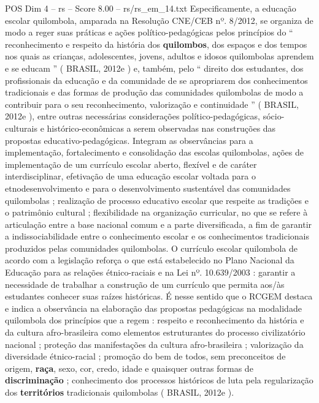 \begin{textsample}{POS Dim 4 – rs – Score 8.00 – rs/rs\_em\_14.txt}
Especificamente, a educação escolar quilombola, amparada na Resolução CNE/CEB nº. 8/2012, se organiza de modo a reger suas práticas e ações político-pedagógicas pelos princípios do “ reconhecimento e respeito da história dos \textbf{quilombos}, dos espaços e dos tempos nos quais as crianças, adolescentes, jovens, adultos e idosos quilombolas aprendem e se educam ” ( BRASIL, 2012e ) e, também, pelo “ direito dos estudantes, dos profissionais da educação e da comunidade de se apropriarem dos conhecimentos tradicionais e das formas de produção das comunidades quilombolas de modo a contribuir para o seu reconhecimento, valorização e continuidade ” ( BRASIL, 2012e ), entre outras necessárias considerações político-pedagógicas, sócio-culturais e histórico-econômicas a serem observadas nas construções das propostas educativo-pedagógicas.
Integram as observâncias para a implementação, fortalecimento e consolidação das escolas quilombolas, ações de implementação de um currículo escolar aberto, flexível e de caráter interdisciplinar, efetivação de uma educação escolar voltada para o etnodesenvolvimento e para o desenvolvimento sustentável das comunidades quilombolas ; realização de processo educativo escolar que respeite as tradições e o patrimônio cultural ; flexibilidade na organização curricular, no que se refere à articulação entre a base nacional comum e a parte diversificada, a fim de garantir a indissociabilidade entre o conhecimento escolar e os conhecimentos tradicionais produzidos pelas comunidades quilombolas.
O currículo escolar quilombola de acordo com a legislação reforça o que está estabelecido no Plano Nacional da Educação para as relações étnico-raciais e na Lei nº. 10.639/2003 : garantir a necessidade de trabalhar a construção de um currículo que permita aos/às estudantes conhecer suas raízes históricas.
É nesse sentido que o RCGEM destaca e indica a observância na elaboração das propostas pedagógicas na modalidade quilombola dos princípios que a regem : respeito e reconhecimento da história e da cultura afro-brasileira como elementos estruturantes do processo civilizatório nacional ; proteção das manifestações da cultura afro-brasileira ; valorização da diversidade étnico-racial ; promoção do bem de todos, sem preconceitos de origem, \textbf{raça}, sexo, cor, credo, idade e quaisquer outras formas de \textbf{discriminação} ; conhecimento dos processos históricos de luta pela regularização dos \textbf{territórios} tradicionais quilombolas ( BRASIL, 2012e ).

\end{textsample}
